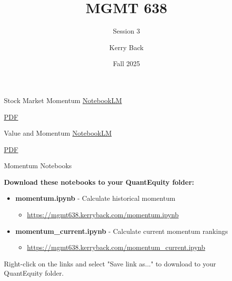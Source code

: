 \documentclass[aspectratio=169]{beamer}
\title{MGMT 638}
\subtitle{Session 3}
\author{Kerry Back}
\institute{}
\date{Fall 2025}
\begin{document}
\maketitle

\begin{frame}{Stock Market Momentum}
\centering
\Large
\href{https://notebooklm.google.com/notebook/bb68e968-c8cd-4ed1-8e5c-a577d17b8f04}{NotebookLM}

\vspace{1em}

\href{https://mgmt638.kerryback.com/Jegadeesh_Titman_ARFE_2011.pdf}{PDF}
\end{frame}

\begin{frame}{Value and Momentum}
\centering
\Large
\href{https://notebooklm.google.com/notebook/7869da1f-7d2b-4a2e-9d59-83d129a0cc86}{NotebookLM}

\vspace{1em}

\href{https://mgmt638.kerryback.com/Asness_Moskowitz_Pedersen_2013.pdf}{PDF}
\end{frame}

\begin{frame}{Momentum Notebooks}

\textbf{Download these notebooks to your QuantEquity folder:}

\vspace{1em}

\begin{itemize}
    \item \textbf{momentum.ipynb} - Calculate historical momentum
    \begin{itemize}
        \item \url{https://mgmt638.kerryback.com/momentum.ipynb}
    \end{itemize}

    \vspace{0.5em}

    \item \textbf{momentum\_current.ipynb} - Calculate current momentum rankings
    \begin{itemize}
        \item \url{https://mgmt638.kerryback.com/momentum_current.ipynb}
    \end{itemize}
\end{itemize}

\vspace{1em}

\small
Right-click on the links and select "Save link as..." to download to your QuantEquity folder.

\end{frame}
\end{document}

